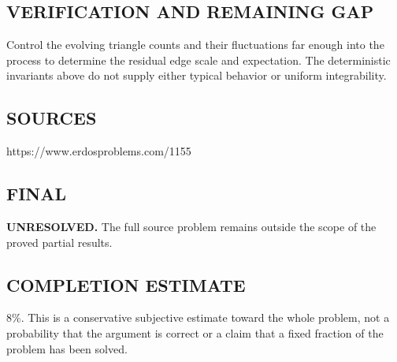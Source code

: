 \subsection*{VERIFICATION AND REMAINING GAP}
Control the evolving triangle counts and their fluctuations far enough into
the process to determine the residual edge scale and expectation. The deterministic
invariants above do not supply either typical behavior or uniform integrability.

\subsection*{SOURCES}
https://www.erdosproblems.com/1155

\subsection*{FINAL}
\textbf{UNRESOLVED.} The full source problem remains outside the scope of the proved partial results.

\subsection*{COMPLETION ESTIMATE}
$8\%$. This is a conservative subjective estimate toward the whole problem, not a probability that the argument is correct or a claim that a fixed fraction of the problem has been solved.
